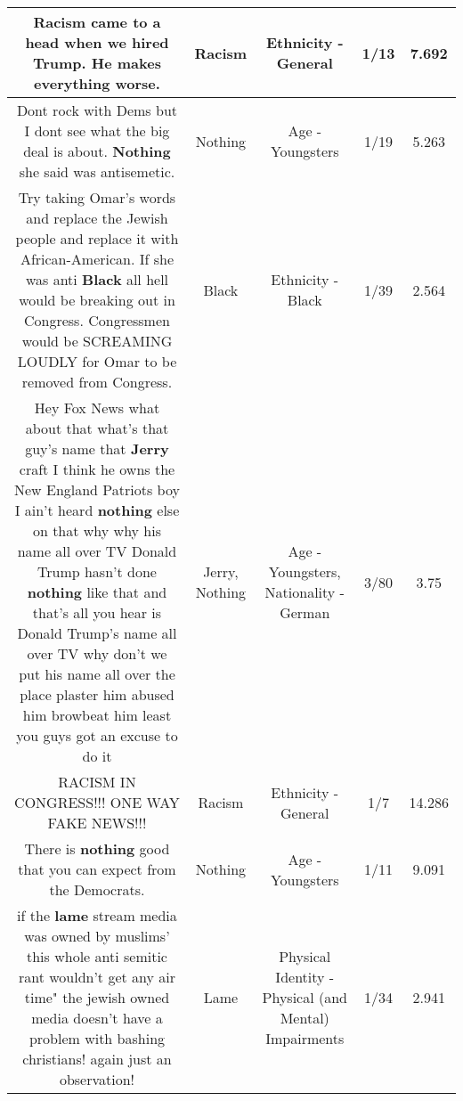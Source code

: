 \documentclass[11pt]{article}
\newlength\mylength
\begin{document}
\begin{center}
\begin{longtable}{|C{.65\mylength}|C{.30\mylength}|C{.12\mylength}|C{.12\mylength}|C{.12\mylength}|}
  \small Racism came to a head when we hired Trump. He makes everything worse.\normalsize   & Racism & Ethnicity - General & 1/13 & 7.692 \\  \hline
  \small Dont rock with Dems but I dont see what the big deal is about. \textbf{Nothing} she said was antisemetic.\normalsize   & Nothing & Age - Youngsters & 1/19 & 5.263 \\  \hline
  \small Try taking Omar's words and replace the Jewish people and replace it with African-American. If she was anti \textbf{Black} all hell would be breaking out in Congress.  Congressmen would be SCREAMING LOUDLY for Omar to be removed from Congress.\normalsize   & Black & Ethnicity - Black & 1/39 & 2.564 \\  \hline
  \small Hey Fox News what about that what's that guy's name that \textbf{Jerry} craft I think he owns the New England Patriots boy I ain't heard \textbf{nothing} else on that why why his name all over TV Donald Trump hasn't done \textbf{nothing} like that and that's all you hear is Donald Trump's name all over TV why don't we put his name all over the place plaster him abused him browbeat him least you guys got an excuse to do it\normalsize   & Jerry, Nothing & Age - Youngsters, Nationality - German & 3/80 & 3.75 \\  \hline
  \small RACISM IN CONGRESS!!!  ONE WAY FAKE NEWS!!!\normalsize   & Racism & Ethnicity - General & 1/7 & 14.286 \\  \hline
  \small There is \textbf{nothing} good that you can expect from the Democrats.\normalsize   & Nothing & Age - Youngsters & 1/11 & 9.091 \\  \hline
  \small if the \textbf{lame} stream media was owned by muslims' this whole anti semitic rant wouldn't get any air time" the jewish owned media doesn't have a problem with bashing christians! again just an observation!\normalsize   & Lame & Physical Identity - Physical (and Mental) Impairments & 1/34 & 2.941 \\  \hline

\end{longtable}
\end{center}
\end{document}
